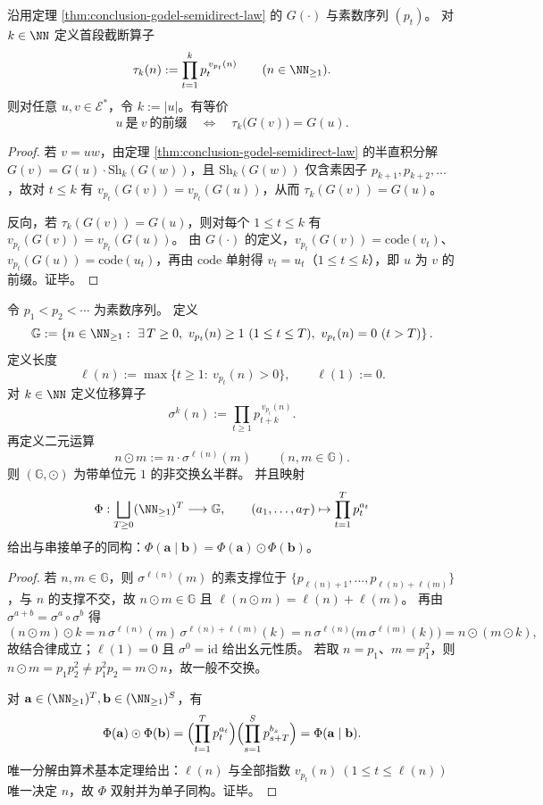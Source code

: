 
\begin{theorem}[前缀关系的纯算术判据]\label{thm:conclusion-godel-prefix-arithmetic-criterion}
沿用定理 \ref{thm:conclusion-godel-semidirect-law} 的 \(G(\cdot)\) 与素数序列 \((p_t)\)。
对 \(k\in\NN\) 定义首段截断算子
\[
\tau_k(n):=\prod_{t=1}^{k} p_t^{\,v_{p_t}(n)}\qquad(n\in\NN_{\ge 1}).
\]
则对任意 \(u,v\in\mathcal E^\ast\)，令 \(k:=|u|\)。有等价
\[
u\ \text{是}\ v\ \text{的前缀}
\quad\Longleftrightarrow\quad
\tau_k\!\bigl(G(v)\bigr)=G(u).
\]
\end{theorem}
\begin{proof}
若 \(v=uw\)，由定理 \ref{thm:conclusion-godel-semidirect-law} 的半直积分解
\(
G(v)=G(u)\cdot \mathrm{Sh}_{k}(G(w))
\)，且 \(\mathrm{Sh}_{k}(G(w))\) 仅含素因子 \(p_{k+1},p_{k+2},\dots\)，故对 \(t\le k\) 有
\(
v_{p_t}(G(v))=v_{p_t}(G(u))
\)，从而 \(\tau_k(G(v))=G(u)\)。
\par
反向，若 \(\tau_k(G(v))=G(u)\)，则对每个 \(1\le t\le k\) 有
\(
v_{p_t}(G(v))=v_{p_t}(G(u))
\)。
由 \(G(\cdot)\) 的定义，\(v_{p_t}(G(v))=\mathrm{code}(v_t)\)、\(v_{p_t}(G(u))=\mathrm{code}(u_t)\)，再由 \(\mathrm{code}\) 单射得 \(v_t=u_t\)（\(1\le t\le k\)），即 \(u\) 为 \(v\) 的前缀。证毕。
\end{proof}

\begin{proposition}\label{prop:conclusion-godel-prefix-prime-monoid}
令 \(p_1<p_2<\cdots\) 为素数序列。
定义
\[
\mathbb G:=
\left\{
n\in\NN_{\ge 1}:\ \exists\,T\ge 0,\ 
v_{p_t}(n)\ge 1\ (1\le t\le T),\
v_{p_t}(n)=0\ (t>T)
\right\}.
\]
定义长度
\[
\ell(n):=\max\{t\ge 1:\ v_{p_t}(n)>0\},
\qquad \ell(1):=0.
\]
对 \(k\in\NN\) 定义位移算子
\[
\sigma^k(n):=\prod_{t\ge 1}p_{t+k}^{\,v_{p_t}(n)}.
\]
再定义二元运算
\[
n\odot m:=n\cdot \sigma^{\ell(n)}(m)\qquad(n,m\in\mathbb G).
\]
则 \((\mathbb G,\odot)\) 为带单位元 \(1\) 的非交换幺半群。
并且映射
\[
\Phi:\bigsqcup_{T\ge 0}(\NN_{\ge 1})^T\longrightarrow \mathbb G,\qquad
(a_1,\dots,a_T)\mapsto \prod_{t=1}^{T}p_t^{a_t}
\]
给出与串接单子的同构：\(\Phi(\mathbf a\mid \mathbf b)=\Phi(\mathbf a)\odot\Phi(\mathbf b)\)。
\end{proposition}
\begin{proof}
若 \(n,m\in\mathbb G\)，则 \(\sigma^{\ell(n)}(m)\) 的素支撑位于
\(\{p_{\ell(n)+1},\dots,p_{\ell(n)+\ell(m)}\}\)，与 \(n\) 的支撑不交，故
\(
n\odot m\in\mathbb G
\)
且
\(
\ell(n\odot m)=\ell(n)+\ell(m)
\)。
再由
\(
\sigma^{a+b}=\sigma^a\circ\sigma^b
\)
得
\[
(n\odot m)\odot k
=n\,\sigma^{\ell(n)}(m)\,\sigma^{\ell(n)+\ell(m)}(k)
=n\,\sigma^{\ell(n)}\!\bigl(m\,\sigma^{\ell(m)}(k)\bigr)
=n\odot(m\odot k),
\]
故结合律成立；\(\ell(1)=0\) 且 \(\sigma^0=\mathrm{id}\) 给出幺元性质。
若取 \(n=p_1\)、\(m=p_1^2\)，则
\(
n\odot m=p_1p_2^2\neq p_1^2p_2=m\odot n
\)，故一般不交换。
\par
对 \(\mathbf a\in(\NN_{\ge 1})^T,\mathbf b\in(\NN_{\ge 1})^S\)，有
\[
\Phi(\mathbf a)\odot\Phi(\mathbf b)
=\Bigl(\prod_{t=1}^T p_t^{a_t}\Bigr)\Bigl(\prod_{s=1}^{S}p_{s+T}^{b_s}\Bigr)
=\Phi(\mathbf a\mid \mathbf b).
\]
唯一分解由算术基本定理给出：\(\ell(n)\) 与全部指数
\(
v_{p_t}(n)\ (1\le t\le \ell(n))
\)
唯一决定 \(n\)，故 \(\Phi\) 双射并为单子同构。证毕。
\end{proof}

